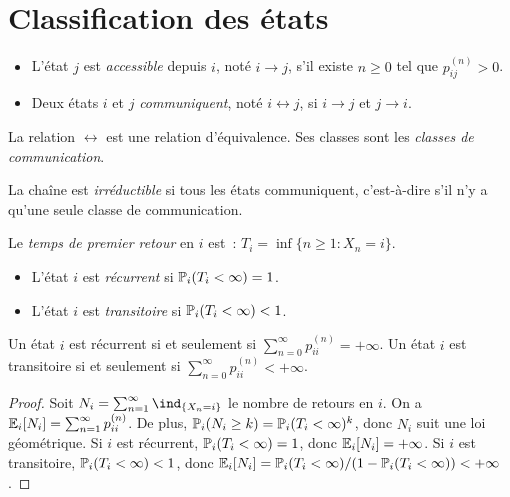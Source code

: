 \section{Classification des \'etats}

\begin{definition}
\begin{itemize}
    \item L'\'etat $j$ est \emph{accessible} depuis $i$, not\'e $i \to j$, s'il
    existe $n \geq 0$ tel que $p_{ij}^{(n)} > 0$.
    \item Deux \'etats $i$ et $j$ \emph{communiquent}, not\'e $i \leftrightarrow j$,
    si $i \to j$ et $j \to i$.
\end{itemize}
La relation $\leftrightarrow$ est une relation d'\'equivalence. Ses classes sont les
\emph{classes de communication}.
\end{definition}

\begin{definition}
La cha\^ine est \emph{irr\'eductible} si tous les \'etats communiquent, c'est-\`a-dire
s'il n'y a qu'une seule classe de communication.
\end{definition}

\begin{definition}
Le \emph{temps de premier retour} en $i$ est~:
$T_i = \inf\{n \geq 1 : X_n = i\}$.
\begin{itemize}
    \item L'\'etat $i$ est \emph{r\'ecurrent} si $\mathbb{P}_i(T_i < \infty) = 1$.
    \item L'\'etat $i$ est \emph{transitoire} si $\mathbb{P}_i(T_i < \infty) < 1$.
\end{itemize}
\end{definition}

\begin{theoreme}
\label{thm:recurrence}
Un \'etat $i$ est r\'ecurrent si et seulement si $\sum_{n=0}^{\infty} p_{ii}^{(n)} = +\infty$.
Un \'etat $i$ est transitoire si et seulement si $\sum_{n=0}^{\infty} p_{ii}^{(n)} < +\infty$.
\end{theoreme}

\begin{proof}
Soit $N_i = \sum_{n=1}^{\infty} \ind_{\{X_n = i\}}$ le nombre de retours en $i$.
On a $\mathbb{E}_i[N_i] = \sum_{n=1}^{\infty} p_{ii}^{(n)}$. De plus,
$\mathbb{P}_i(N_i \geq k) = \mathbb{P}_i(T_i < \infty)^k$, donc $N_i$ suit une loi g\'eom\'etrique.
Si $i$ est r\'ecurrent, $\mathbb{P}_i(T_i < \infty) = 1$, donc $\mathbb{E}_i[N_i] = +\infty$.
Si $i$ est transitoire, $\mathbb{P}_i(T_i < \infty) < 1$, donc
$\mathbb{E}_i[N_i] = \mathbb{P}_i(T_i < \infty)/(1 - \mathbb{P}_i(T_i < \infty)) < +\infty$.
\end{proof}

